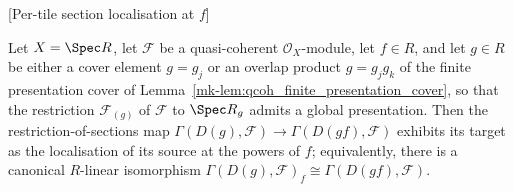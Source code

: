\begin{lemma}

[Per-tile section localisation at \(f\)]
  \label{mk-lem:tile_section_localization}

  Let \(X = \Spec R\), let \(\mathcal{F}\) be a quasi-coherent \(\mathcal{O}_X\)-module, let \(f \in R\),
  and let \(g \in R\) be either a cover element \(g = g_j\) or an overlap product \(g = g_j g_k\) of the
  finite presentation cover of Lemma~\ref{mk-lem:qcoh_finite_presentation_cover}, so that the restriction \(\mathcal{F}_{(g)}\) of
  \(\mathcal{F}\) to \(\Spec R_g\) admits a global presentation. Then the restriction-of-sections map
  \(\Gamma(D(g), \mathcal{F}) \to \Gamma(D(gf), \mathcal{F})\) exhibits its target as the localisation of
  its source at the powers of \(f\); equivalently, there is a canonical \(R\)-linear isomorphism
  \(\Gamma(D(g), \mathcal{F})_f \cong \Gamma(D(gf), \mathcal{F})\).
\end{lemma}
